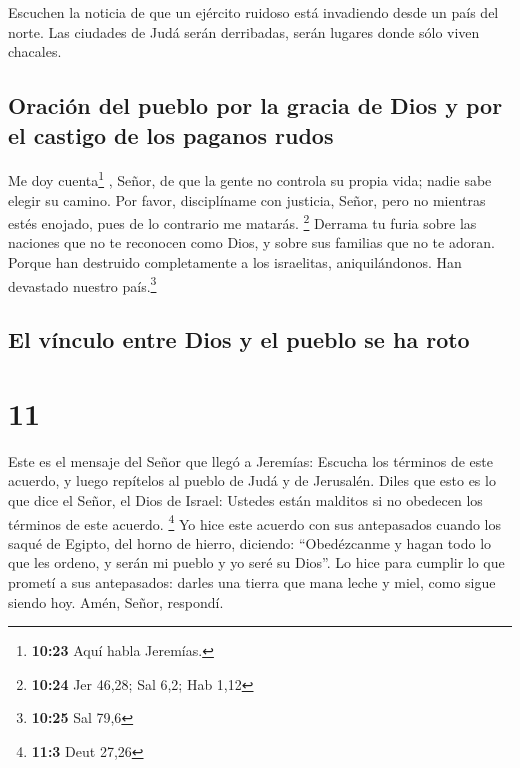  Escuchen la noticia de que un ejército ruidoso está
invadiendo desde un país del norte. Las ciudades de Judá serán
derribadas, serán lugares donde sólo viven chacales.

\hypertarget{oraciuxf3n-del-pueblo-por-la-gracia-de-dios-y-por-el-castigo-de-los-paganos-rudos}{%
\subsection{Oración del pueblo por la gracia de Dios y por el castigo de
los paganos
rudos}\label{oraciuxf3n-del-pueblo-por-la-gracia-de-dios-y-por-el-castigo-de-los-paganos-rudos}}

 Me doy cuenta\footnote{\textbf{10:23} Aquí habla
  Jeremías.} , Señor, de que la gente no controla su propia vida; nadie
sabe elegir su camino.  Por favor, disciplíname con
justicia, Señor, pero no mientras estés enojado, pues de lo contrario me
matarás. \footnote{\textbf{10:24} Jer 46,28; Sal 6,2; Hab 1,12}
 Derrama tu furia sobre las naciones que no te reconocen
como Dios, y sobre sus familias que no te adoran. Porque han destruido
completamente a los israelitas, aniquilándonos. Han devastado nuestro
país.\footnote{\textbf{10:25} Sal 79,6}

\hypertarget{el-vuxednculo-entre-dios-y-el-pueblo-se-ha-roto}{%
\subsection{El vínculo entre Dios y el pueblo se ha
roto}\label{el-vuxednculo-entre-dios-y-el-pueblo-se-ha-roto}}

\hypertarget{section-10}{%
\section{11}\label{section-10}}

 Este es el mensaje del Señor que llegó a Jeremías:
 Escucha los términos de este acuerdo, y luego repítelos
al pueblo de Judá y de Jerusalén.  Diles que esto es lo
que dice el Señor, el Dios de Israel: Ustedes están malditos si no
obedecen los términos de este acuerdo. \footnote{\textbf{11:3} Deut
  27,26}  Yo hice este acuerdo con sus antepasados cuando
los saqué de Egipto, del horno de hierro, diciendo: ``Obedézcanme y
hagan todo lo que les ordeno, y serán mi pueblo y yo seré su Dios''.
 Lo hice para cumplir lo que prometí a sus antepasados:
darles una tierra que mana leche y miel, como sigue siendo hoy. Amén,
Señor, respondí.

